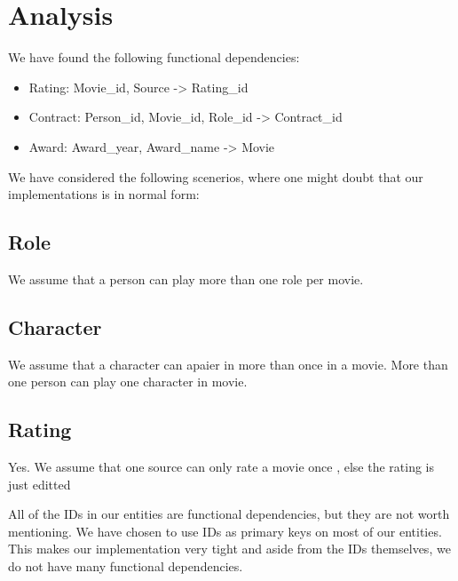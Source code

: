 \section{Analysis}
  We have found the following functional dependencies:
  \begin{itemize}
    \item Rating: Movie\_id, Source -> Rating\_id
    \item Contract: Person\_id, Movie\_id, Role\_id -> Contract\_id
    \item Award: Award\_year, Award\_name -> Movie
  \end{itemize}
  We have considered the following scenerios, where one might doubt that our implementations is in normal form: \\
  \subsection{Role}
    \begin{itemize}
              {We assume that a person can play more than one role per movie.}
    \end{itemize}
  \subsection{Character}
    \begin{itemize}
              {We assume that a character can apaier in more than once in a movie.}
              {More than one person can play one character in movie.}
    \end{itemize}
  \subsection{Rating}
    \begin{itemize}
              {Yes. We assume that one source can only rate a movie once , else the rating is just editted}
    \end{itemize}
    All of the IDs in our entities are functional dependencies, but they are
    not worth mentioning.
    We have chosen to use IDs as primary keys on most of our entities. This
    makes our implementation very tight and aside from the IDs themselves, we
    do not have many functional dependencies.
\newpage
